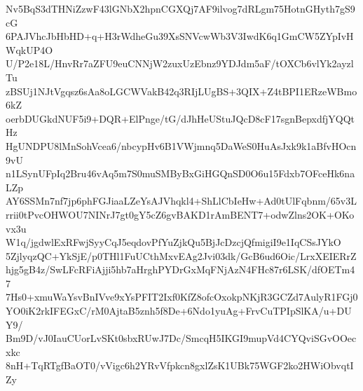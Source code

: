 Nv5BqS3dTHNiZzwF43lGNbX2hpnCGXQj7AF9ilvog7dRLgm75HotnGHyth7gS9cG
6PAJVhcJbHbHD+q+H3rWdheGu39XsSNVcwWb3V3IwdK6q1GmCW5ZYpIvHWqkUP4O
U/P2e18L/HnvRr7aZFU9euCNNjW2zuxUzEbnz9YDJdm5aF/tOXCb6vlYk2ayzlTu
zBSUj1NJtVgqsz6sAa8oLGCWVakB42q3RIjLUgBS+3QIX+Z4tBPI1ERzeWBmo6kZ
oerbDUGkdNUF5i9+DQR+ElPnge/tG/dJhHeUStuJQcD8cF17sgnBepxdfjYQQtHz
HgUNDPU8lMnSohVcea6/nbcypHv6B1VWjmnq5DaWeS0HuAsJxk9k1aBfvHOcn9vU
n1LSynUFpIq2Bru46vAq5m7S0muSMByBxGiHGQnSD0O6u15Fdxb7OFceHk6naLZp
AY6SSMn7nf7jp6phFGJiaaLZeYsAJVhqkl4+ShLlCbIeHw+Ad0tUlFqbnm/65v3L
rrii0tPvcOHWOU7NINrJ7gt0gY5cZ6gvBAKD1rAmBENT7+odwZlns2OK+OKovx3u
W1q/jgdwlExRFwjSyyCqJ5eqdovPfYuZjkQu5BjJcDzcjQfmigiI9e1IqCSsJYkO
5ZjlyqzQC+YkSjE/p0THl1FuUCthMxvEAg2Jvi03dk/GcB6ud6Oic/LrxXEIERrZ
hjg5gB4z/SwLFcRFiAjji5hb7aHrghPYDrGxMqFNjAzN4FHc87r6LSK/dfOETm47
7Hs0+xmuWaYsvBnIVve9xYsPFIT2Ixf0KfZ8ofcOxokpNKjR3GCZd7AulyR1FGj0
YO0iK2rkIFEGxC/rM0AjtaB5znh5f8De+6Ndo1yuAg+FrvCuTPIpSlKA/u+DUY9/
Bm9D/vJ0IauCUorLvSKt0sbxRUwJ7Dc/SmcqH5IKGI9mupVd4CYQviSGvOOecxkc
8nH+TqRTgfBaOT0/vVigc6h2YRvVfpkcn8gxlZsK1UBk75WGF2ko2HWiObvqtIZy

